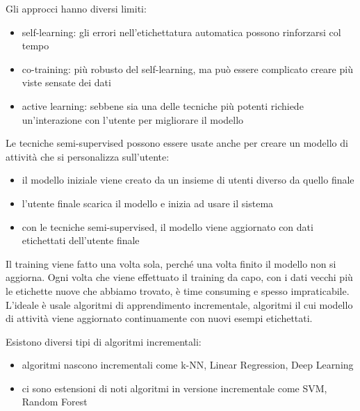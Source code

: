 Gli approcci hanno diversi limiti:
\begin{itemize}
    \item self-learning: gli errori nell'etichettatura automatica possono rinforzarsi col tempo
    \item co-training: più robusto del self-learning, ma può essere complicato creare più viste sensate dei dati
    \item active learning: sebbene sia una delle tecniche più potenti richiede un'interazione con l'utente per migliorare il modello
\end{itemize}

Le tecniche semi-supervised possono essere usate anche per creare un modello di attività che si personalizza sull'utente:
\begin{itemize}
    \item il modello iniziale viene creato da un insieme di 
    utenti diverso da quello finale
    \item l'utente finale scarica il modello e inizia ad usare il sistema
    \item con le tecniche semi-supervised, il modello viene aggiornato con dati etichettati dell'utente finale
\end{itemize}

Il training viene fatto una volta sola, perché una volta finito il modello non si aggiorna. Ogni volta che viene effettuato il training da capo, con i dati vecchi più le etichette nuove che abbiamo trovato, è time consuming e spesso impraticabile.
L'ideale è usale algoritmi di apprendimento incrementale, algoritmi il cui modello di attività viene aggiornato continuamente con nuovi esempi etichettati.

Esistono diversi tipi di algoritmi incrementali:
\begin{itemize}
    \item algoritmi nascono incrementali come k-NN, Linear Regression, Deep Learning
    \item ci sono estensioni di noti algoritmi in versione incrementale come SVM, Random Forest 
\end{itemize} 
